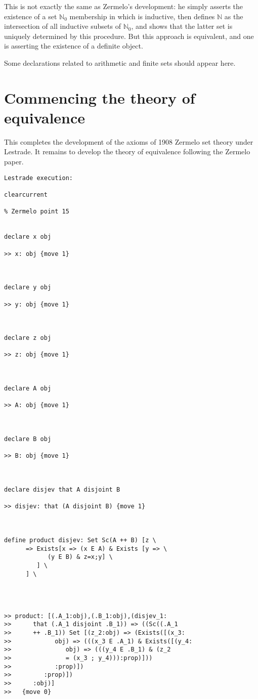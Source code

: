 \documentclass[12pt]{article}
\begin{document}
This is not exactly the same as Zermelo's development:  he simply asserts the existence of a set ${\mathbb N}_0$ membership in which is inductive, then defines
$\mathbb N$ as the intersection of all inductive subsets of ${\mathbb N}_0$, and shows that the latter set is uniquely determined by this procedure.  But this approach is
equivalent, and one is asserting the existence of a definite object.

Some declarations related to arithmetic and finite sets should appear here.

\section{Commencing the theory of equivalence}

This completes the development of the axioms of 1908 Zermelo set theory under Lestrade.  It remains to develop the theory of equivalence following the Zermelo paper.

\begin{verbatim}Lestrade execution:

clearcurrent

% Zermelo point 15


declare x obj

>> x: obj {move 1}



declare y obj

>> y: obj {move 1}



declare z obj

>> z: obj {move 1}



declare A obj

>> A: obj {move 1}



declare B obj

>> B: obj {move 1}



declare disjev that A disjoint B

>> disjev: that (A disjoint B) {move 1}



define product disjev: Set Sc(A ++ B) [z \
      => Exists[x => (x E A) & Exists [y => \
            (y E B) & z=x;y] \
         ] \
      ] \
   



>> product: [(.A_1:obj),(.B_1:obj),(disjev_1:
>>      that (.A_1 disjoint .B_1)) => ((Sc((.A_1
>>      ++ .B_1)) Set [(z_2:obj) => (Exists([(x_3:
>>            obj) => (((x_3 E .A_1) & Exists([(y_4:
>>               obj) => (((y_4 E .B_1) & (z_2
>>               = (x_3 ; y_4))):prop)]))
>>            :prop)])
>>         :prop)])
>>      :obj)]
>>   {move 0}


\end{verbatim}
\end{document}
